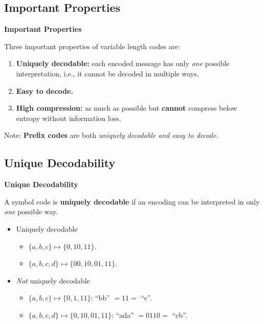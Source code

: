 \documentclass[compress]{beamer}        %
\makeatletter
\newcommand{\tcb}{\textcolor{beamer@blendedblue}}
\makeatother
\begin{document}
\subsection{Important Properties}
\begin{frame}{\bf \tcb{Important Properties}}

Three important properties of variable length codes are:\\[0.5cm]
\begin{enumerate}[1.]\itemsep0.8cm
\item {\bf Uniquely decodable:} each encoded message has only \emph{one} possible interpretation, i.e., it cannot be decoded in multiple ways.
\item {\bf Easy to decode.}
\item {\bf High compression:} as much as possible but {\bf cannot} compress below entropy without information loss.\\[0.8cm]%
\end{enumerate}

Note: {\bf Prefix codes} are both \emph{uniquely decodable and easy to decode}.

\end{frame}




\subsection{Unique Decodability}
\begin{frame}{\bf \tcb{Unique Decodability}}

A symbol code is {\bf uniquely decodable} if an encoding can be interpreted in only \emph{one} possible way.\\[0.4cm]


\begin{itemize}\itemsep0.8cm
\item Uniquely decodable\\[0.2cm]
\begin{itemize}\itemsep0.4cm
\item $\{a,b,c\} \mapsto \{0,10,11\}$.
\item $\{a,b,c,d\} \mapsto \{00,10,01,11\}$.
\end{itemize}
\item \emph{Not} uniquely decodable\\[0.2cm]
\begin{itemize}\itemsep0.4cm
\item $\{a,b,c\} \mapsto \{0,1,11\}$: \quad ``bb'' $=11=$ ``c''.
\item $\{a,b,c,d\} \mapsto \{0,10,01,11\}$: \quad ``ada'' $=0110=$ ``cb''.
\end{itemize}
\end{itemize}



\end{frame}
\end{document}
